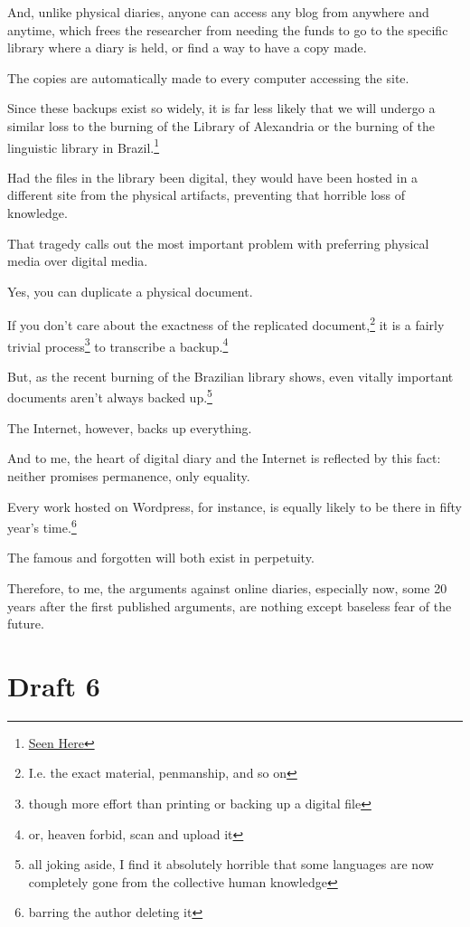 \documentclass[12pt]{article}[titlepage]
\newcommand{\1}{\={a}}
\newcommand{\2}{\={e}}
\newcommand{\3}{\={\i}}
\newcommand{\4}{\=o}
\newcommand{\5}{\=u}
\newcommand{\6}{\={A}}
\renewcommand{\,}{\textsuperscript{,}}
\begin{document}
And, unlike physical diaries, anyone can access any blog from anywhere and anytime, which frees the researcher from needing the funds to go to the specific library where a diary is held, or find a way to have a copy made.

The copies are automatically made to every computer accessing the site.


Since these backups exist so widely, it is far less likely that we will undergo a similar loss to the burning of the Library of Alexandria or the burning of the linguistic library in Brazil.\footnote{\href{https://www.nationalgeographic.com/science/2018/09/news-museu-nacional-fire-rio-de-janeiro-natural-history/}{Seen Here}}

Had the files in the library been digital, they would have been hosted in a different site from the physical artifacts, preventing that horrible loss of knowledge.


That tragedy calls out the most important problem with preferring physical media over digital media.

Yes, you can duplicate a physical document.

If you don’t care about the exactness of the replicated document,\footnote{I.e. the exact material, penmanship, and so on} it is a fairly trivial process\footnote{though more effort than printing or backing up a digital file} to transcribe a backup.\footnote{or, heaven forbid, scan and upload it}

But, as the recent burning of the Brazilian library shows, even vitally important documents aren’t always backed up.\footnote{all joking aside, I find it absolutely horrible that some languages are now completely gone from the collective human knowledge}

The Internet, however, backs up everything.


And to me, the heart of digital diary and the Internet is reflected by this fact: neither promises permanence, only equality.

Every work hosted on Wordpress, for instance, is equally likely to be there in fifty year’s time.\footnote{barring the author deleting it}

The famous and forgotten will both exist in perpetuity.

Therefore, to me, the arguments against online diaries, especially now, some 20 years after the first published arguments, are nothing except baseless fear of the future.


\section{Draft 6}
\end{document}
